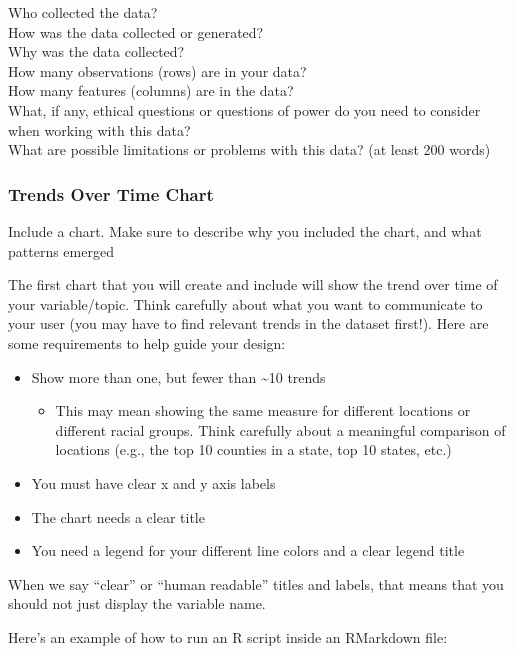 \documentclass[
]{article}
\providecommand{\tightlist}{%
  \setlength{\itemsep}{0pt}\setlength{\parskip}{0pt}}
\begin{document}
Who collected the data?\\
How was the data collected or generated?\\
Why was the data collected?\\
How many observations (rows) are in your data?\\
How many features (columns) are in the data?\\
What, if any, ethical questions or questions of power do you need to
consider when working with this data?\\
What are possible limitations or problems with this data? (at least 200
words)

\subsubsection{Trends Over Time Chart}\label{trends-over-time-chart}

Include a chart. Make sure to describe why you included the chart, and
what patterns emerged

The first chart that you will create and include will show the trend
over time of your variable/topic. Think carefully about what you want to
communicate to your user (you may have to find relevant trends in the
dataset first!). Here are some requirements to help guide your design:

\begin{itemize}
\tightlist
\item
  Show more than one, but fewer than \textasciitilde10 trends

  \begin{itemize}
  \tightlist
  \item
    This may mean showing the same measure for different locations or
    different racial groups. Think carefully about a meaningful
    comparison of locations (e.g., the top 10 counties in a state, top
    10 states, etc.)
  \end{itemize}
\item
  You must have clear x and y axis labels
\item
  The chart needs a clear title~
\item
  You need a legend for your different line colors and a clear legend
  title
\end{itemize}

When we say ``clear'' or ``human readable'' titles and labels, that
means that you should not just display the variable name.

Here's an example of how to run an R script inside an RMarkdown file:
\end{document}

